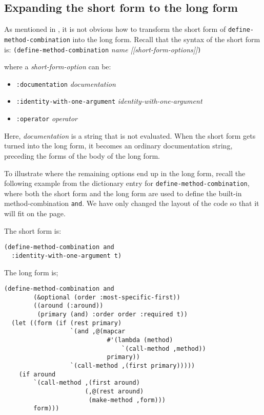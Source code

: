 \subsection{Expanding the short form to the long form}

As mentioned in , it is not obvious how to
transform the short form of \texttt{define-method-combination} into
the long form.  Recall that the syntax of the short form is:
\vskip 0.1cm
\noindent
\texttt{(define-method-combination} \textit{name [[short-form-options]]}\texttt{)}

where a \textit{short-form-option} can be:

\begin{itemize}
\item \texttt{:documentation} \textit{documentation}
\item \texttt{:identity-with-one-argument} \textit{identity-with-one-argument}
\item \texttt{:operator} \textit{operator}
\end{itemize}

Here, \textit{documentation} is a string that is not evaluated.  When
the short form gets turned into the long form, it becomes an ordinary
documentation string, preceding the forms of the body of the long
form.

To illustrate where the remaining options end up in the long form,
recall the following example from the dictionary entry for
\texttt{define-method-combination}, where both the short form and the
long form are used to define the built-in method-combination
\texttt{and}.  We have only changed the layout of the code so that it
will fit on the page.

\noindent
The short form is:

{\small\begin{verbatim}
(define-method-combination and
  :identity-with-one-argument t)
\end{verbatim}}

\noindent
The long form is;

{\small\begin{verbatim}
(define-method-combination and
        (&optional (order :most-specific-first))
        ((around (:around))
         (primary (and) :order order :required t))
  (let ((form (if (rest primary)
                  `(and ,@(mapcar
                            #'(lambda (method)
                                `(call-method ,method))
                            primary))
                  `(call-method ,(first primary)))))
    (if around
        `(call-method ,(first around)
                      (,@(rest around)
                       (make-method ,form)))
        form)))
\end{verbatim}}

